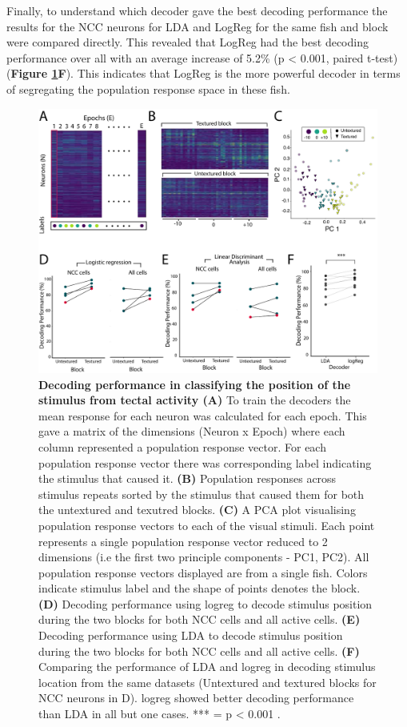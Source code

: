 Finally, to understand which decoder gave the best decoding performance the results for the NCC neurons for LDA and LogReg for the same fish and block were compared directly. This revealed that LogReg had the best decoding performance over all with an average increase of 5.2\% (p < 0.001, paired t-test) (\textbf{Figure \ref{fig:R3_F4}F}). This indicates that LogReg is the more powerful decoder in terms of segregating the population response space in these fish.


\begin{figure}[!ht]
        \captionsetup{}
        \centering
        \includegraphics[width =  0.75\paperwidth]{Figures/Decoding_figure.pdf}
       \caption[\label{fig:R3_F4} \textbf{Decoding performance in classifying the position of the stimulus from tectal activity}]{\label{fig:R3_F4} \textbf{Decoding performance in classifying the position of the stimulus from tectal activity (A)}  To train the decoders the mean response for each neuron was calculated for each epoch. This gave a matrix of the dimensions (Neuron x Epoch) where each column represented a population response vector. For each population response vector there was corresponding label indicating the stimulus that caused it. \textbf{(B)} Population responses across stimulus repeats sorted by the stimulus that caused them for both the untextured and texutred blocks. \textbf{(C)} A PCA plot visualising population response vectors to each of the visual stimuli. Each point represents a single population response vector reduced to 2 dimensions (i.e the first two principle components - PC1, PC2). All population response vectors displayed are from a single fish. Colors indicate stimulus label and the shape of points denotes the block. \textbf{(D)} Decoding performance using \gls{logreg} to decode stimulus position during the two blocks for both NCC cells and all active cells. \textbf{(E)}  Decoding performance using LDA to decode stimulus position during the two blocks for both NCC cells and all active cells. \textbf{(F)} Comparing the performance of LDA and \gls{logreg} in decoding stimulus location from the same datasets (Untextured and textured blocks for NCC neurons in D). \gls{logreg} showed better decoding performance than LDA in all but one cases. *** = p < 0.001 .
    }
\end{figure}


